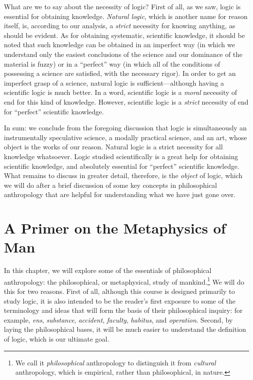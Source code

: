 \documentclass[
  12pt,
]{memoir}
\begin{document}
What are we to say about the necessity of logic? First of all, as we
saw, logic is essential for obtaining knowledge. \emph{Natural logic},
which is another name for reason itself, is, according to our analysis,
a \emph{strict} necessity for knowing anything, as should be evident. As
for obtaining systematic, scientific knowledge, it should be noted that
such knowledge can be obtained in an imperfect way (in which we
understand only the easiest conclusions of the science and our dominance
of the material is fuzzy) or in a ``perfect'' way (in which all of the
conditions of possessing a science are satisfied, with the necessary
rigor). In order to get an imperfect grasp of a science, natural logic
is sufficient---although having a scientific logic is much better. In a
word, scientific logic is a \emph{moral} necessity of end for this kind
of knowledge. However, scientific logic is a \emph{strict} necessity of
end for ``perfect'' scientific knowledge.

In sum: we conclude from the foregoing discussion that logic is
simultaneously an instrumentally speculative science, a modally
practical science, and an art, whose object is the works of our reason.
Natural logic is a strict necessity for all knowledge whatsoever. Logic
studied scientifically is a great help for obtaining scientific
knowledge, and absolutely essential for ``perfect'' scientific
knowledge. What remains to discuss in greater detail, therefore, is the
\emph{object} of logic, which we will do after a brief discussion of
some key concepts in philosophical anthropology that are helpful for
understanding what we have just gone over.

\chapter{A Primer on the Metaphysics of
Man}\label{a-primer-on-the-metaphysics-of-man}

In this chapter, we will explore some of the essentials of philosophical
anthropology: the philosophical, or metaphysical, study of
mankind.\footnote{We call it \emph{philosophical} anthropology to
  distinguish it from \emph{cultural} anthropology, which is empirical,
  rather than philosophical, in nature.} We will do this for two
reasons. First of all, although this course is designed primarily to
study logic, it is also intended to be the reader's first exposure to
some of the terminology and ideas that will form the basis of their
philosophical inquiry: for example, \emph{ens}, \emph{substance},
\emph{accident}, \emph{faculty}, \emph{habitus}, and \emph{operation}.
Second, by laying the philosophical bases, it will be much easier to
understand the definition of logic, which is our ultimate goal.
\end{document}
